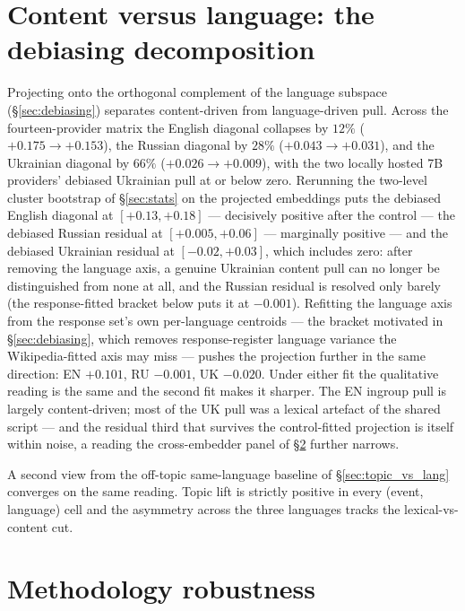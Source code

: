 \section{Content versus language: the debiasing
  decomposition}\label{sec:exp_001_debiased}

Projecting onto the orthogonal complement of the language subspace
(\S\ref{sec:debiasing}) separates content-driven from
language-driven pull. Across the fourteen-provider matrix the
English diagonal collapses by $12\%$ ($+0.175 \to +0.153$), the
Russian diagonal by $28\%$ ($+0.043 \to +0.031$), and the Ukrainian
diagonal by $66\%$ ($+0.026 \to +0.009$), with the two locally
hosted 7B providers' debiased Ukrainian pull at or below zero.
Rerunning the two-level cluster bootstrap of \S\ref{sec:stats} on
the projected embeddings puts the debiased English diagonal at
$[+0.13, +0.18]$ --- decisively positive after the control --- the
debiased Russian residual at $[+0.005, +0.06]$ --- marginally
positive --- and the debiased Ukrainian residual at
$[-0.02, +0.03]$, which includes zero: after removing the language
axis, a genuine Ukrainian content pull can no longer be
distinguished from none at all, and the Russian residual is
resolved only barely (the response-fitted bracket below puts it at
$-0.001$). Refitting the language axis from
the response set's own per-language centroids --- the bracket
motivated in \S\ref{sec:debiasing}, which removes response-register
language variance the Wikipedia-fitted axis may miss --- pushes the
projection further in the same direction: EN $+0.101$, RU
$-0.001$, UK $-0.020$. Under either fit the qualitative reading is
the same and the second fit makes it sharper. The
EN ingroup pull is largely content-driven; most of the UK pull was
a lexical artefact of the shared script --- and the residual third
that survives the control-fitted projection is itself within noise,
a reading the
cross-embedder panel of \S\ref{sec:exp_015} further narrows.

A second view from the off-topic same-language baseline of
\S\ref{sec:topic_vs_lang} converges on the same reading. Topic lift
is strictly positive in every (event, language) cell and the
asymmetry across the three languages tracks the lexical-vs-content
cut.

\section{Methodology robustness}\label{sec:exp_015}\label{sec:exp_015_debiased}\label{sec:exp_017}

